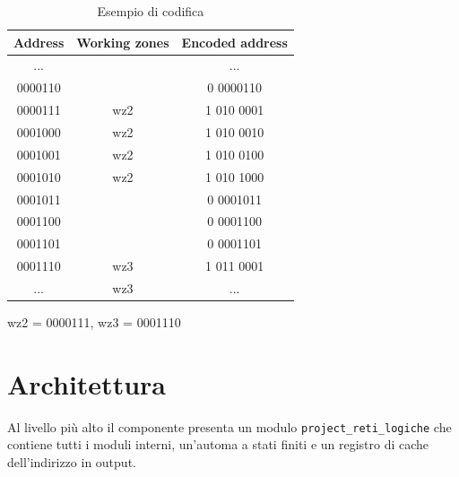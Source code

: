 \documentclass[a4paper]{article}
\begin{document}
\begin{table}[H]
  \centering
  \ttfamily
  \begin{tabular} {|c|c|c|}
    \hline
    \bf{Address} & \bf{Working zones}          & \bf{Encoded address} \\
    \hline
    ...          &                             & ...                  \\
    \hline
    0000110      &                             & 0 0000110            \\
    \hline
    0000111      & \cellcolor[HTML]{E0E0E0}wz2 & 1 010 0001           \\
    \hline
    0001000      & \cellcolor[HTML]{E0E0E0}wz2 & 1 010 0010           \\
    \hline
    0001001      & \cellcolor[HTML]{E0E0E0}wz2 & 1 010 0100           \\
    \hline
    0001010      & \cellcolor[HTML]{E0E0E0}wz2 & 1 010 1000           \\
    \hline
    0001011      &                             & 0 0001011            \\
    \hline
    0001100      &                             & 0 0001100            \\
    \hline
    0001101      &                             & 0 0001101            \\
    \hline
    0001110      & \cellcolor[HTML]{E0E0E0}wz3 & 1 011 0001           \\
    \hline
    ...          & \cellcolor[HTML]{E0E0E0}wz3 & ...                  \\
    \hline
  \end{tabular}
  
  wz2 = 0000111, wz3 = 0001110
  \caption{Esempio di codifica}
  \label{tab:example}
\end{table}

\pagebreak
\section{Architettura}
Al livello più alto il componente presenta un modulo \texttt{project\_reti\_logiche} che contiene tutti i moduli interni, un'automa a stati finiti e un registro di cache dell'indirizzo in output.
\end{document}
